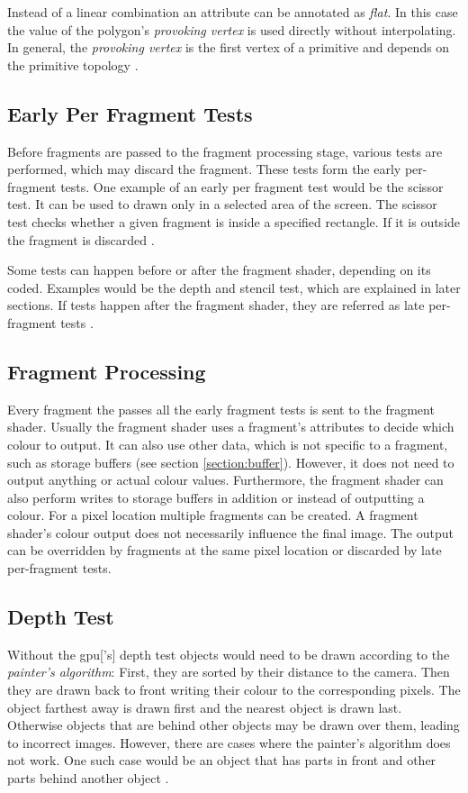 Instead of a linear combination an attribute can be annotated as \textit{flat}. In this case the value of the polygon's \textit{provoking vertex} is used directly without interpolating. In general, the \textit{provoking vertex} is the first vertex of a primitive and depends on the primitive topology \cite{akine:2018:realtime, khronos:vulkan:spec1.1}.

\subsection{Early Per Fragment Tests}
Before fragments are passed to the fragment processing stage, various tests are performed, which may discard the fragment. These tests form the early per-fragment tests. One example of an early per fragment test would be the scissor test. It can be used to drawn only in a selected area of the screen. The scissor test checks whether a given fragment is inside a specified rectangle. If it is outside the fragment is discarded \cite{khronos:vulkan:spec1.1}. 

Some tests can happen before or after the fragment shader, depending on its coded. Examples would be the depth and stencil test, which are explained in later sections. If tests happen after the fragment shader, they are referred as late per-fragment tests \cite{khronos:vulkan:spec1.1}.

\subsection{Fragment Processing}
\label{section:fragmentprocessing}
Every fragment the passes all the early fragment tests is sent to the fragment shader. Usually the fragment shader uses a fragment's attributes to decide which colour to output.
It can also use other data, which is not specific to a fragment, such as storage buffers (see section \ref{section:buffer}). However, it does not need to output anything or actual colour values.  Furthermore, the fragment shader can also perform writes to storage buffers in addition or instead of outputting a colour. For a pixel location multiple fragments can be created. A fragment shader's colour output does not necessarily influence the final image. The output can be overridden by fragments at the same pixel location or discarded by late per-fragment tests.


\subsection{Depth Test}
\label{section:depthtest}
Without the \gls{gpu}['s] depth test objects would need to be drawn according to the \textit{painter's algorithm}: First, they are sorted by their distance to the camera. Then they are drawn back to front writing their colour to the corresponding pixels. The object farthest away is drawn first and the nearest object is drawn last. Otherwise objects that are behind other objects may be drawn over them, leading to incorrect images. However, there are cases where the painter's algorithm does not work. One such case would be an object that has parts in front and other parts behind another object \cite{akine:2018:realtime}.

